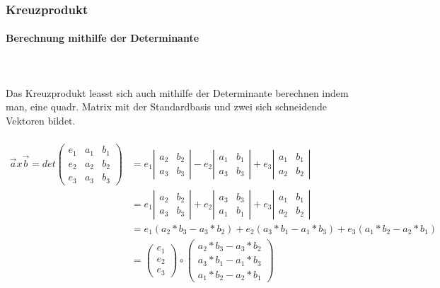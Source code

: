 \documentclass[a4paper]{article} %
\begin{document}
	\subsubsection{Kreuzprodukt}
	\paragraph{Berechnung mithilfe der Determinante}
	\hspace{0 cm} \\ \noindent \\
	Das Kreuzprodukt leasst sich auch mithilfe der Determinante berechnen indem man, eine quadr. Matrix mit der Standardbasis und zwei sich schneidende Vektoren
	bildet.\\\\
	$\begin{array}{cc}
	\vec{a} x \vec{b}=det\begin{pmatrix} e_1 & a_1 & b_1 \\ e_2 & a_2 & b_2  \\ e_3 & a_3 & b_3  \end{pmatrix} 
	&= e_1\left|\begin{array}{cc} a_2 & b_2 \\ a_3 & b_3\end{array} \right|-e_2\left|\begin{array}{cc} a_1 & b_1 \\ a_3 & b_3\end{array} \right|+e_3\left|\begin{array}{cc} a_1 & b_1 \\ a_2 & b_2\end{array} \right|\\
	&= e_1\left|\begin{array}{cc} a_2 & b_2 \\ a_3 & b_3\end{array} \right|+e_2\left|\begin{array}{cc} a_3 & b_3 \\ a_1 & b_1\end{array} \right|+e_3\left|\begin{array}{cc} a_1 & b_1 \\ a_2 & b_2\end{array} \right|\\
	&= e_1(a_2*b_3-a_3*b_2)+e_2(a_3*b_1-a_1*b_3)+e_3(a_1*b_2-a_2*b_1)\\
	&=\begin{pmatrix} e_1 \\ e_2 \\ e_3 \end{pmatrix} \circ \begin{pmatrix} a_2*b_3-a_3*b_2 \\ a_3*b_1-a_1*b_3 \\ a_1*b_2-a_2*b_1 \end{pmatrix} 
	\end{array}$
\end{document}
